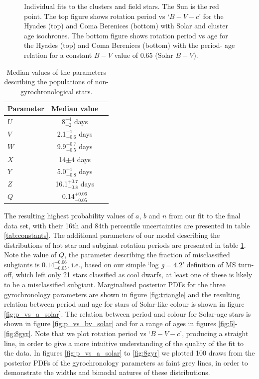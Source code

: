 \documentclass[useAMS, usenatbib]{mn2e}
\newcommand{\logg}{log \emph{g}}
\newcommand{\U}{8}  %
\newcommand{\V}{2.1}  %
\newcommand{\W}{9.9}  %
\newcommand{\X}{14} %
\newcommand{\Y}{5.0}  %
\newcommand{\Z}{16.1}  %
\newcommand{\Q}{0.14}
\newcommand{\Uerrp}{4}
\newcommand{\Uerrm}{2}
\newcommand{\Verrp}{1}
\newcommand{\Verrm}{0.6}
\newcommand{\Werrp}{0.7}
\newcommand{\Werrm}{0.5}
\newcommand{\Xerr}{4}
\newcommand{\Yerrp}{1}
\newcommand{\Yerrm}{0.8}
\newcommand{\Zerrp}{0.7}
\newcommand{\Zerrm}{0.8}
\newcommand{\Qerrp}{0.06}
\newcommand{\Qerrm}{0.05}
\begin{document}
\begin{figure}
\begin{center}
{        }
    \end{center}
    \caption{ Individual fits to the clusters and field stars. The Sun is the
	    red point. The top figure shows rotation period vs `$B-V-c$' for
	    the Hyades (top) and Coma Berenices (bottom) with Solar and cluster
	    age isochrones. The bottom figure shows rotation period vs age
	    for the Hyades (top) and Coma Berenices (bottom) with the period-
	    age relation for a constant $B-V$ value of 0.65 (Solar $B-V$).
\label{fig:subfigures1}}
\end{figure}

\begin{table}
\caption{Median values of the parameters describing the populations of
	non-gyrochronological stars. \label{tab:nuisance}}

\begin{center}
\begin{tabular}{lcc}
\hline\hline
{Parameter} & {Median value} \\
\hline
$U$ & \U$^{+\Uerrp}_{-\Uerrm}$ days \\
$V$ & \V$^{+\Verrp}_{-\Verrm}$ days \\
$W$ & \W$^{+\Werrp}_{-\Werrm}$ days \\
$X$ & \X$\pm\Xerr$ days \\
$Y$ & \Y$^{+\Yerrp}_{-\Yerrm}$ days \\
$Z$ & \Z$^{+\Zerrp}_{-\Zerrm}$ days \\
$Q$ & \Q$^{+\Qerrp}_{-\Qerrm}$ \\
\hline
\end{tabular}
\end{center}
\end{table}

The resulting highest probability values of $a$, $b$ and $n$ from our fit to
the final data set, with their 16th and 84th percentile uncertainties are
presented in table \ref{tab:constants}.
The additional parameters of our model describing the distributions of hot
star and subgiant rotation periods are presented in table \ref{tab:nuisance}.
Note the value of $Q$, the parameter describing the fraction of misclassified
subgiants is $\Q^{+\Qerrp}_{-\Qerrm}$, i.e., based on our simple `\logg$=4.2$'
definition of MS turn-off, which left only 21 stars classified as cool dwarfs,
at least one of these is likely to be a misclassified subgiant.
Marginalised posterior PDFs for the three gyrochronology parameters are shown
in figure \ref{fig:triangle} and the resulting relation between period and age
for stars of Solar-like colour is shown in figure \ref{fig:p_vs_a_solar}.
The relation between period and colour for Solar-age stars is shown in figure
\ref{fig:p_vs_bv_solar} and for a range of ages in figures
\ref{fig:5}-\ref{fig:8gyr}.
Note that we plot rotation period vs `$B-V-c$', producing a straight line, in
order to give a more intuitive understanding of the quality of the fit to the
data.
In figures \ref{fig:p_vs_a_solar} to \ref{fig:8gyr} we plotted 100 draws from
the posterior PDFs of the gyrochronology parameters as faint grey lines,
in order to demonstrate the widths and bimodal natures of these distributions.
\end{document}
